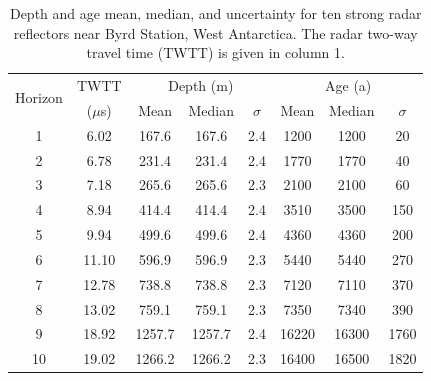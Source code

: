\documentclass[12pt]{article}
\begin{document}
\vspace*{-10mm}
\begin{table}[ht]
\centering
\begin{tabular}{| c | c || c | c | c || c | c | c |}
\hline
\multirow{2}{*}{Horizon} & \multicolumn{1}{c||}{TWTT} &  \multicolumn{3}{c||}{Depth (m)} & \multicolumn{3}{c|}{Age (a)} \\   
\cline{3-8}
& ($\mu$s)& Mean & Median & $\sigma$ & Mean & Median & $\sigma$ \\
\hline
 1 & 6.02   & 167.6  & 167.6  & 2.4 & 1200 & 1200 & 20   \\
 2 & 6.78   & 231.4  & 231.4  & 2.4 & 1770 & 1770 & 40   \\
 3 & 7.18   & 265.6  & 265.6  & 2.3 & 2100 & 2100 & 60  \\
 4 & 8.94   & 414.4  & 414.4  & 2.4 & 3510 & 3500 & 150   \\
 5 & 9.94   & 499.6  & 499.6  & 2.4 & 4360 & 4360 & 200   \\
 6 & 11.10  & 596.9  & 596.9  & 2.3 & 5440 & 5440 & 270   \\
 7 & 12.78  & 738.8  & 738.8  & 2.3 & 7120 & 7110 & 370   \\
 8 & 13.02  & 759.1  & 759.1  & 2.3 & 7350 & 7340 & 390   \\
 9 & 18.92  & 1257.7 & 1257.7 & 2.4 & 16220 & 16300 & 1760   \\
 10& 19.02  & 1266.2 & 1266.2 & 2.3 & 16400 & 16500 & 1820  \\
\hline
\end{tabular}
\captionsetup{width=.9\textwidth}
\caption{Depth and age mean, median, and uncertainty for ten strong radar reflectors near Byrd Station, West Antarctica. The radar two-way travel time (TWTT) is given in column 1. }
\end{table}
\label{table:results}
\end{document}

